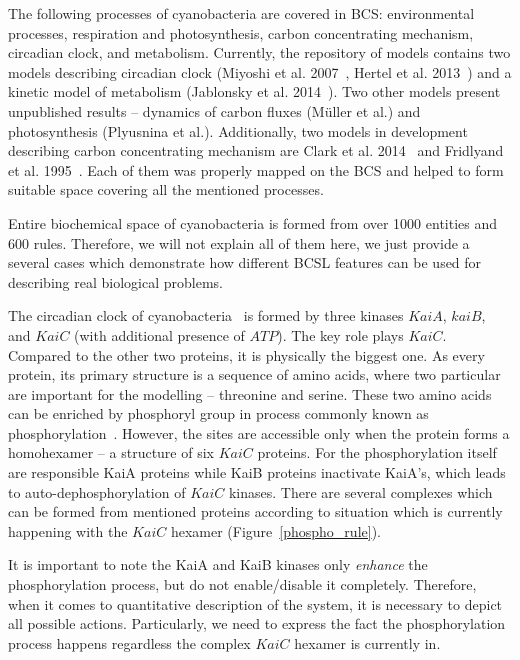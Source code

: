 \documentclass[12pt]{fithesis2}
\begin{document}
The following processes of cyanobacteria are covered in BCS: environmental processes, respiration and photosynthesis, carbon concentrating mechanism, circadian clock, and metabolism. Currently, the repository of models contains two models describing circadian clock (Miyoshi et al. 2007~\cite{Miyoshi01022007}, Hertel et al. 2013~\cite{Hertel2013}) and a kinetic model of metabolism (Jablonsky et al. 2014~\cite{Jablonsky2014}). Two other models present unpublished results -- dynamics of carbon fluxes (M\"{u}ller et al.) and photosynthesis (Plyusnina et al.). Additionally, two models in development describing carbon concentrating mechanism are Clark et al. 2014~\cite{clark2014insights} and Fridlyand et al. 1995~\cite{fridlyand1996quantitative}. Each of them was properly mapped on the BCS and helped to form suitable space covering all the mentioned processes.

Entire biochemical space of cyanobacteria is formed from over 1000 entities and 600 rules. Therefore, we will not explain all of them here, we just provide a several cases which demonstrate how different BCSL features can be used for describing real biological problems.

The circadian clock of cyanobacteria~\cite{CCR} is formed by three kinases $KaiA$, $kaiB$, and $KaiC$ (with additional presence of $ATP$). The key role plays $KaiC$. Compared to the other two proteins, it is physically the biggest one. As every protein, its primary structure is a sequence of amino acids, where two particular are important for the modelling -- threonine and serine. These two amino acids can be enriched by phosphoryl group in process commonly known as phosphorylation~\cite{cohen2002origins}. However, the sites are accessible only when the protein forms a homohexamer -- a structure of six $KaiC$ proteins. For the phosphorylation itself are responsible KaiA proteins while KaiB proteins inactivate KaiA's, which leads to auto-dephosphorylation of $KaiC$ kinases. There are several complexes which can be formed from mentioned proteins according to situation which is currently happening with the $KaiC$ hexamer (Figure~\ref{phospho_rule}).

It is important to note the KaiA and KaiB kinases only \emph{enhance} the phosphorylation process, but do not enable/disable it completely. Therefore, when it comes to quantitative description of the system, it is necessary to depict all possible actions. Particularly, we need to express the fact the phosphorylation process happens regardless the complex $KaiC$ hexamer is currently in. 
\end{document}

